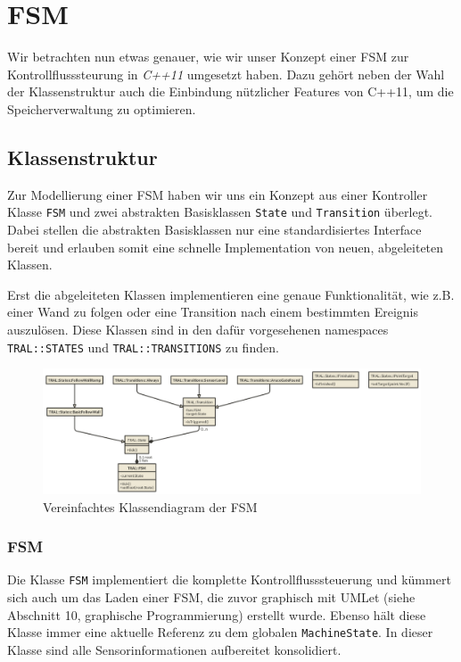 \section{FSM}
\label{sec:fsm}
Wir betrachten nun etwas genauer, wie wir unser Konzept einer FSM zur 
Kontrollflusssteurung in \textit{C++11} umgesetzt haben. Dazu gehört neben der Wahl 
der Klassenstruktur auch die Einbindung nützlicher Features von C++11, um die
Speicherverwaltung zu optimieren.


\subsection{Klassenstruktur}
Zur Modellierung einer FSM haben wir uns ein Konzept aus einer Kontroller Klasse \texttt{FSM} und zwei abstrakten Basisklassen \texttt{State} und \texttt{Transition} überlegt. Dabei stellen die abstrakten Basisklassen nur eine standardisiertes Interface bereit und erlauben somit eine schnelle Implementation von neuen, abgeleiteten Klassen.


Erst die abgeleiteten Klassen implementieren eine genaue Funktionalität, wie z.B. einer Wand zu folgen oder eine Transition nach einem bestimmten Ereignis auszulösen. Diese Klassen sind in den dafür vorgesehenen namespaces \texttt{TRAL::STATES} und \texttt{TRAL::TRANSITIONS} zu finden.

\begin{figure}[htbp] 
  \centering
     \includegraphics[width=\textwidth]{images/fsm-uml.png}
  \caption{Vereinfachtes Klassendiagram der FSM}
  \label{fig:KlassendiagramFSM}
\end{figure}

\subsubsection{FSM}
Die Klasse \texttt{FSM} implementiert die komplette Kontrollflusssteuerung und kümmert sich auch um das Laden einer FSM, die zuvor graphisch mit UMLet (siehe Abschnitt 10, graphische Programmierung) erstellt wurde. Ebenso hält diese Klasse immer eine aktuelle Referenz zu dem globalen \texttt{MachineState}. In dieser Klasse sind alle Sensorinformationen aufbereitet konsolidiert.

